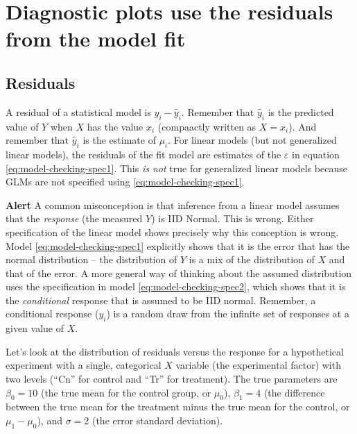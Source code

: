 \documentclass[]{book}
\begin{document}
\hypertarget{diagnostic-plots-use-the-residuals-from-the-model-fit}{%
\section{Diagnostic plots use the residuals from the model fit}\label{diagnostic-plots-use-the-residuals-from-the-model-fit}}

\hypertarget{residuals}{%
\subsection{Residuals}\label{residuals}}

A residual of a statistical model is \(y_i - \hat{y}_i\). Remember that \(\hat{y}_i\) is the predicted value of \(Y\) when \(X\) has the value \(x_i\) (compaactly written as \(X=x_i\)). And remember that \(\hat{y}_i\) is the estimate of \(\mu_i\). For linear models (but not generalized linear models), the residuals of the fit model are estimates of the \(\varepsilon\) in equation \eqref{eq:model-checking-spec1}. This \emph{is not} true for generalized linear models because GLMs are not specified using \eqref{eq:model-checking-spec1}.

\textbf{Alert} A common misconception is that inference from a linear model assumes that the \emph{response} (the measured \(Y\)) is IID Normal. This is wrong. Either specification of the linear model shows precisely why this conception is wrong. Model \eqref{eq:model-checking-spec1} explicitly shows that it is the error that has the normal distribution -- the distribution of \(Y\) is a mix of the distribution of \(X\) and that of the error. A more general way of thinking about the assumed distribution uses the specification in model \eqref{eq:model-checking-spec2}, which shows that it is the \emph{conditional} response that is assumed to be IID normal. Remember, a conditional response (\(y_i\)) is a random draw from the infinite set of responses at a given value of \(X\).

Let's look at the distribution of residuals versus the response for a hypothetical experiment with a single, categorical \(X\) variable (the experimental factor) with two levels (``Cn'' for control and ``Tr'' for treatment). The true parameters are \(\beta_0 = 10\) (the true mean for the control group, or \(\mu_{0}\)), \(\beta_1=4\) (the difference between the true mean for the treatment minus the true mean for the control, or \(\mu_1 - \mu_0\)), and \(\sigma = 2\) (the error standard deviation).
\end{document}
